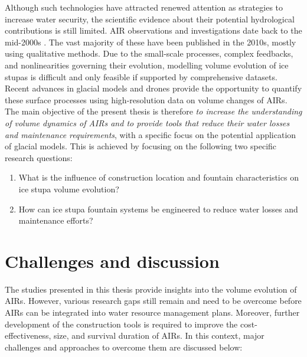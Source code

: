 Although such technologies have attracted renewed attention as strategies to increase water security, the scientific evidence about their potential hydrological contributions is still limited. \ac{AIR} observations and investigations
date back to the mid-2000s \citep{tveitenGlacierGrowingLocal2007}. The vast majority of these have been published in the
2010s, mostly using qualitative methods. Due to the small-scale processes, complex feedbacks, and nonlinearities
governing their evolution, modelling volume evolution of ice stupas is difficult and only feasible if supported
by comprehensive datasets. Recent advances in glacial models and drones provide the opportunity to quantify
these surface processes using high-resolution data on volume changes of \ac{AIRs}. The main objective of the present
thesis is therefore \textit{to increase the understanding of volume dynamics of \ac{AIRs} and to provide tools
that reduce their water losses and maintenance requirements}, with a specific focus on the potential application
of glacial models. This is achieved by focusing on the following two specific research questions:

\begin{enumerate}
  \item{What is the influence of construction location and fountain characteristics on ice stupa volume
    evolution?}
  \item{How can ice stupa fountain systems be engineered to reduce water losses and maintenance efforts?}
\end{enumerate}


\section{Challenges and discussion}

The studies presented in this thesis provide insights into the volume evolution of \ac{AIRs}. However, various
research gaps still remain and need to be overcome before \ac{AIRs} can be integrated into water resource
management plans. Moreover, further development of the construction tools is required to improve the
cost-effectiveness, size, and survival duration of \ac{AIRs}. In this context, major challenges and approaches
to overcome them are discussed below:

